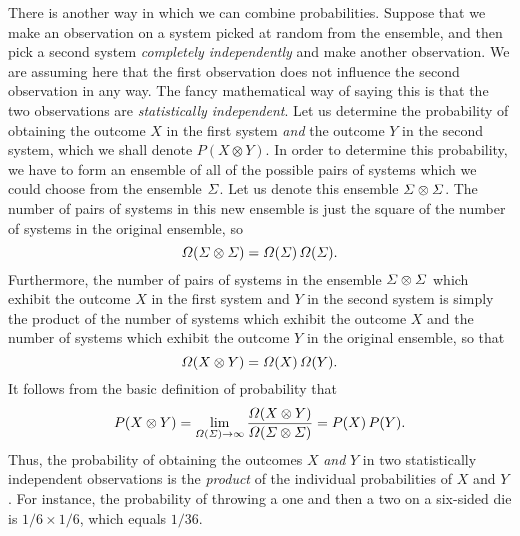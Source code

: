 There is another way in which we can combine probabilities. Suppose 
that we 
make an observation on a system picked at random from the ensemble, and then
pick a second system {\em completely independently} and
make another observation. We  are assuming here that the first 
observation does not influence the second observation in 
any way. The fancy mathematical way of saying this is that the two
observations are {\em statistically independent}.
Let us determine the probability of obtaining
the outcome $X$ in the first system {\em and}\/
 the outcome $Y$ in the second system, which we shall denote
$P(X\otimes Y)$.
 In order to determine this probability, we have to form an ensemble of all
of the possible pairs of systems which we could choose from the ensemble
${{\mit\Sigma}}$. Let us denote this ensemble ${{\mit\Sigma}}\otimes {{\mit\Sigma}}$. 
The number of pairs of systems in this new 
ensemble is just the
square of the number of systems in the original ensemble, so
\begin{equation}
{\mit\Omega}({{\mit\Sigma}}\otimes{{\mit\Sigma}}) = {\mit\Omega}({{\mit\Sigma}})\, {\mit\Omega}({{\mit\Sigma}}).
\end{equation}
Furthermore, the number of pairs of systems
in the ensemble ${{\mit\Sigma}}\otimes {{\mit\Sigma}}$
 which exhibit the
outcome $X$ in the first system and $Y$ in the second system
  is simply the
product of the number of systems which exhibit the outcome $X$ 
and the number of systems which exhibit the outcome $Y$ in the original
ensemble, so that 
\begin{equation}
{\mit\Omega}(X\otimes Y) = {\mit\Omega}(X) \,{\mit\Omega}(Y).
\end{equation}
It follows from the basic definition of probability that
\begin{equation}
P(X\otimes Y) =\lim_{{\mit\Omega}({\mit\Sigma})\rightarrow\infty}
  \frac{{\mit\Omega}(X\otimes Y)}{{\mit\Omega}({{\mit\Sigma}}\otimes {{\mit\Sigma}})}= P(X) \,P(Y).
\end{equation}
Thus, the probability of obtaining the outcomes $X$ {\em and}
 $Y$ in two statistically independent
observations is  the {\em product} of the individual probabilities of
$X$ and $Y$. For instance, the probability of throwing a one and then a two
on a six-sided die is $1/6 \times 1/6$, which equals $1/36$.

